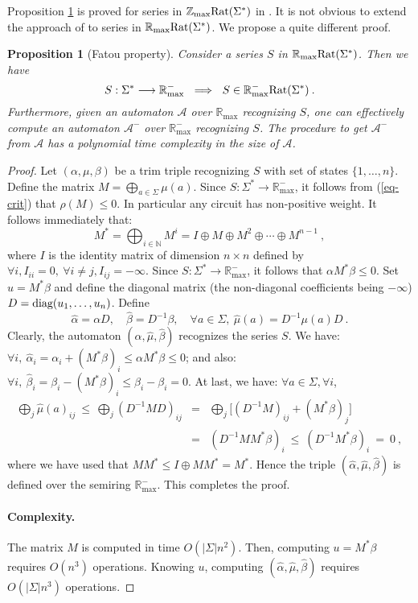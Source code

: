 \documentclass{article}
\newtheorem{prpstn}[thrm]{Proposition}
\newcommand{\mrm}[1]{\text{\rm #1}}
\newcommand{\N} {\ensuremath{\mathbb{N}}}
\newcommand{\Z} {\ensuremath{\mathbb{Z}}}
\newcommand{\R} {\ensuremath{\mathbb{R}}}
\newcommand{\Zmax} {\Z_{\max}}
\newcommand{\Rmax} {\R_{\max}}
\newcommand{\1}{\mathbb{1}}
\newcommand{\0}{\mathbb{0}}
\def\ab{\Sigma}
\def\A{\mathcal{A}}
\begin{document}
Proposition \ref{pr-fatou} is proved for series in
$\Zmax\mrm{Rat}(\ab^*)$ in \cite[Proposition 4.2]{krob94}. It is not obvious to
extend the approach of \cite{krob94} to series in
$\Rmax\mrm{Rat}(\ab^*)$. We propose a quite different proof. 

\begin{prpstn}[Fatou property]\label{pr-fatou}
Consider a series $S$ in $\Rmax\mrm{Rat}(\ab^*)$. Then we have
\[
S: \ab^*\longrightarrow \Rmax^- \ \implies \ S\in \Rmax^-\mrm{Rat}(\ab^*)\:.
\]
Furthermore, given an automaton $\A$ over $\Rmax$ recognizing
$S$, one can effectively compute an automaton $\A^-$ over $\Rmax^-$
recognizing $S$. The procedure to get $\A^-$ from $\A$ has a
polynomial time complexity in the size of $\A$. 
\end{prpstn}

\begin{proof}
Let $(\alpha,\mu,\beta)$ be a trim triple recognizing $S$ with set of
states $\{1,\dots, n\}$. 
Define the matrix $M=\bigoplus_{a\in \ab} \mu(a)$. Since $S:
\ab^*\longrightarrow \Rmax^-$, it follows from (\ref{eq-crit}) that
$\rho(M)\leq 0$. In particular any circuit has non-positive weight. It
follows immediately that:
\[
M^*=\bigoplus_{i\in \N} M^i = I\oplus M \oplus M^2\oplus \cdots \oplus
M^{n-1}\:,
\]
where $I$ is the identity matrix of dimension $n\times n$ defined by
$\forall i, I_{ii}=0, \ \forall i\neq j, I_{ij}=-\infty$. 
Since $S:
\ab^*\longrightarrow \Rmax^-$, it follows that $\alpha M^*\beta\leq 0$.
Set $u=M^*\beta$ and define the diagonal matrix (the non-diagonal coefficients
being $-\infty$) $D= \mrm{diag} (u_1,\dots, u_n)$. Define
\[
\widehat{\alpha}=\alpha D, \quad \widehat{\beta}=D^{-1}\beta, \quad
\forall a \in \ab, \
\widehat{\mu}(a)=D^{-1}\mu(a)D \:.
\]
Clearly, the automaton $(\widehat{\alpha}, \widehat{\mu} , \widehat{\beta})$ 
recognizes the  series $S$.  
We have: $\forall i, \ \widehat{\alpha}_i = \alpha_i + (M^*\beta)_i \leq
\alpha M^*\beta \leq 0$; and also: $\forall i, \ \widehat{\beta}_i =
\beta_i - (M^*\beta)_i \leq \beta_i -\beta_i =0$. At last, we have:
$\forall a\in \ab, \forall i$,
\begin{eqnarray*}
\bigoplus_j \widehat{\mu}(a)_{ij} \ \leq \ \bigoplus_j (D^{-1}MD)_{ij} & =
&  \bigoplus_j \bigl[ (D^{-1}M)_{ij}+ (M^*\beta)_j \bigr] \\ 
& = & 
(D^{-1}MM^*\beta)_i \ \leq \ (D^{-1}M^*\beta)_i\ =\ 0 \:,
\end{eqnarray*}
where we have used that $MM^*\leq I\oplus MM^*=M^*$.
Hence the triple $(\widehat{\alpha}, \widehat{\mu} , \widehat{\beta})$
is defined over the semiring $\Rmax^-$. This completes the proof. 



\paragraph{Complexity.}
The matrix $M$ is computed in time $O(|\ab|n^2)$. 
Then, computing $u=M^*\beta$ requires $O(n^3)$ operations. Knowing $u$,
computing 
$(\widehat{\alpha}, \widehat{\mu} , \widehat{\beta})$ requires
$O(|\ab|n^3)$ operations. 
\end{proof}
\end{document}
